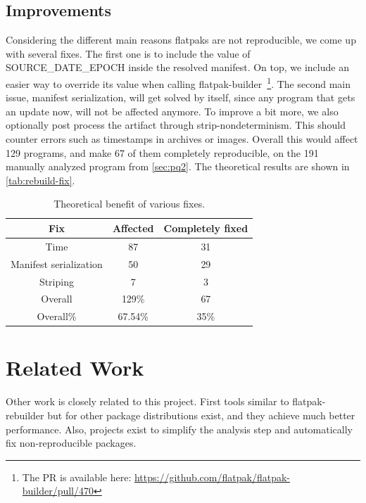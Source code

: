 \documentclass[a4paper,11pt,oneside]{report}
\theoremstyle{definition}
\newcommand{\sysname}{flatpak-rebuilder\xspace}
\newcommand{\fb}{flatpak-builder\xspace}
\newcommand{\sde}{SOURCE\_DATE\_EPOCH\xspace}
\begin{document}
\section{Improvements}
\label{sec:imp}
Considering the different main reasons flatpaks are not reproducible, we come
up with several fixes. The first one is to include the value of \sde inside the
resolved manifest. On top, we include an easier way to override its value when
calling \fb~\footnote{The PR is available here:
\url{https://github.com/flatpak/flatpak-builder/pull/470}}. The second main
issue, manifest serialization, will get solved by itself, since any program
that gets an update now, will not be affected anymore. To improve a bit more,
we also optionally post process the artifact through strip-nondeterminism. This
should counter errors such as timestamps in archives or images. Overall this
would affect 129 programs, and make 67 of them completely reproducible, on the
191 manually analyzed program from \autoref{sec:pq2}. The theoretical results
are shown in \autoref{tab:rebuild-fix}.

\begin{table}[h]
    \centering
        \begin{tabular}{|c|c|c|}
            \hline
            Fix & Affected & Completely fixed\\
            \hline
            Time & 87 & 31\\
            \hline
            Manifest serialization & 50 & 29 \\
            \hline
            Striping & 7 & 3\\
            \hline
            Overall & 129\% & 67\\
            \hline
            Overall\% & 67.54\% & 35\%\\
            \hline
        \end{tabular}
    \caption{Theoretical benefit of various fixes.}
    \label{tab:rebuild-fix}
\end{table}

\chapter{Related Work}
\label{chap:relw}

Other work is closely related to this project. First tools similar to \sysname
but for other package distributions exist, and they achieve much better
performance. Also, projects exist to simplify the analysis step and
automatically fix non-reproducible packages.
\end{document}
